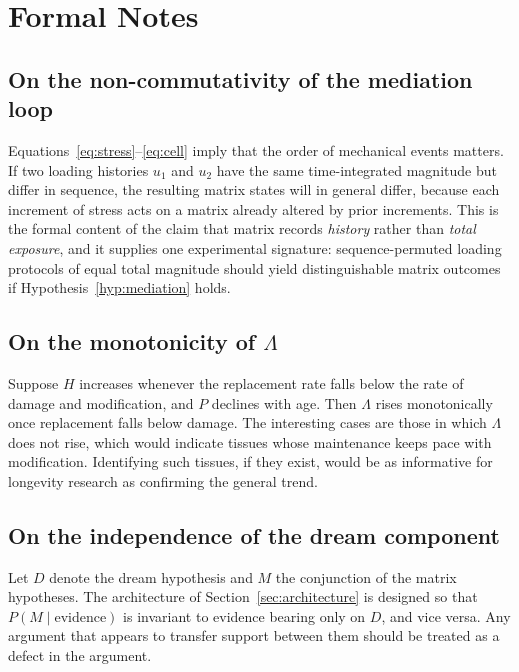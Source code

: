 \documentclass[11pt,a4paper]{article}
\theoremstyle{plain}
\theoremstyle{definition}
\theoremstyle{remark}
\begin{document}
\section{Formal Notes}

\subsection{On the non-commutativity of the mediation loop}

Equations~\eqref{eq:stress}--\eqref{eq:cell} imply that the order of mechanical events matters. If two loading histories $u_1$ and $u_2$ have the same time-integrated magnitude but differ in sequence, the resulting matrix states will in general differ, because each increment of stress acts on a matrix already altered by prior increments. This is the formal content of the claim that matrix records \emph{history} rather than \emph{total exposure}, and it supplies one experimental signature: sequence-permuted loading protocols of equal total magnitude should yield distinguishable matrix outcomes if Hypothesis~\ref{hyp:mediation} holds.

\subsection{On the monotonicity of $\Lambda$}

Suppose $H$ increases whenever the replacement rate falls below the rate of damage and modification, and $P$ declines with age. Then $\Lambda$ rises monotonically once replacement falls below damage. The interesting cases are those in which $\Lambda$ does not rise, which would indicate tissues whose maintenance keeps pace with modification. Identifying such tissues, if they exist, would be as informative for longevity research as confirming the general trend.

\subsection{On the independence of the dream component}

Let $D$ denote the dream hypothesis and $M$ the conjunction of the matrix hypotheses. The architecture of Section~\ref{sec:architecture} is designed so that $P(M \mid \text{evidence})$ is invariant to evidence bearing only on $D$, and vice versa. Any argument that appears to transfer support between them should be treated as a defect in the argument.
\end{document}

